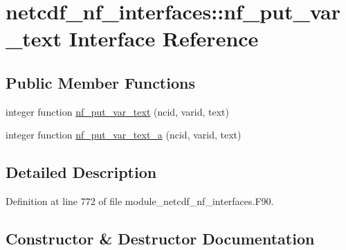 \hypertarget{interfacenetcdf__nf__interfaces_1_1nf__put__var__text}{}\section{netcdf\+\_\+nf\+\_\+interfaces\+:\+:nf\+\_\+put\+\_\+var\+\_\+text Interface Reference}
\label{interfacenetcdf__nf__interfaces_1_1nf__put__var__text}
\subsection*{Public Member Functions}
\begin{DoxyCompactItemize}
\item 
integer function \hyperlink{interfacenetcdf__nf__interfaces_1_1nf__put__var__text_ac36cdede9cbd413a5f7f2da71e453ab1}{nf\+\_\+put\+\_\+var\+\_\+text} (ncid, varid, text)
\item 
integer function \hyperlink{interfacenetcdf__nf__interfaces_1_1nf__put__var__text_ab397e2fd15aec65aa5b76f2a2817d6c6}{nf\+\_\+put\+\_\+var\+\_\+text\+\_\+a} (ncid, varid, text)
\end{DoxyCompactItemize}


\subsection{Detailed Description}


Definition at line 772 of file module\+\_\+netcdf\+\_\+nf\+\_\+interfaces.\+F90.



\subsection{Constructor \& Destructor Documentation}
\mbox{\label{interfacenetcdf__nf__interfaces_1_1nf__put__var__text_ac36cdede9cbd413a5f7f2da71e453ab1}} 
